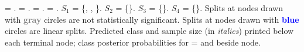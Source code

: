 \documentclass{article}
\begin{document}
\begin{landscape}
\texttt{} = \texttt{}.
\texttt{} = \texttt{}.
\texttt{} = \texttt{}.
\texttt{} = \texttt{}.
 $S_{1}$ = \{\texttt{}, \texttt{},
 \texttt{}\}.
 $S_{2}$ = \{\texttt{}\}.
 $S_{3}$ = \{\texttt{}\}.
 $S_{4}$ = \{\texttt{}\}.
 Splits at nodes drawn with \textbf{\textcolor{gray}{gray}} circles are not statistically significant.
 Splits at nodes drawn with \textbf{\textcolor{blue}{blue}} circles are linear splits.
Predicted class and sample size (in \emph{italics}) printed below each terminal node;
class posterior probabilities for \texttt{} =
 \texttt{} and \texttt{} beside node.
 \end{landscape}
 
\end{document}
